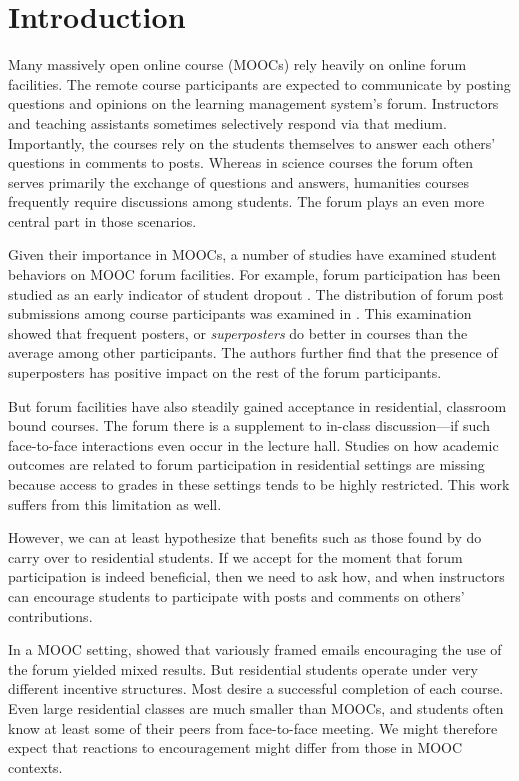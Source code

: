 \section{Introduction}

Many massively open online course (MOOCs) rely heavily on online forum
facilities. The remote course participants are expected to communicate
by posting questions and opinions on the learning management system's
forum. Instructors and teaching assistants sometimes selectively
respond via that medium. Importantly, the courses rely on the students
themselves to answer each others' questions in comments to
posts. Whereas in science courses the forum often serves primarily the
exchange of questions and answers, humanities courses frequently
require discussions among students. The forum plays an even more
central part in those scenarios.

Given their importance in MOOCs, a number of studies have examined
student behaviors on MOOC forum facilities. For example, forum
participation has been studied as an early indicator of student
dropout \cite{yang2013}. The distribution of forum post submissions
among course participants was examined in \cite{Huang2014}. This
examination showed that frequent posters, or {\em superposters} do
better in courses than the average among other participants. The
authors further find that the presence of superposters has positive
impact on the rest of the forum participants.

But forum facilities have also steadily gained acceptance in
residential, classroom bound courses. The forum there is a supplement
to in-class discussion---if such face-to-face interactions even occur
in the lecture hall. Studies on how academic outcomes are related to
forum participation in residential settings are missing because access
to grades in these settings tends to be highly restricted. This work
suffers from this limitation as well.

However, we can at least hypothesize that benefits such as those found
by \cite{Huang2014} do carry over to residential students. If we
accept for the moment that forum participation is indeed beneficial,
then we need to ask how, and when instructors can encourage students
to participate with posts and comments on others' contributions.

In a MOOC setting, \cite{kizilcec2014encouraging} showed that
variously framed emails encouraging the use of the forum yielded mixed
results. But residential students operate under very different
incentive structures. Most desire a successful completion of each
course. Even large residential classes are much smaller than MOOCs,
and students often know at least some of their peers from face-to-face
meeting. We might therefore expect that reactions to encouragement
might differ from those in MOOC contexts.

